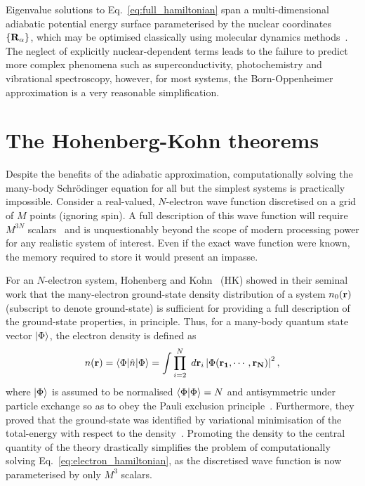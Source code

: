 %
Eigenvalue solutions to Eq.~\eqref{eq:full_hamiltonian} 
span a multi-dimensional adiabatic potential energy surface 
parameterised by the nuclear coordinates $\{{\bf R_\alpha}\}$, 
which may be optimised classically 
using molecular dynamics methods~\cite{PhysRevLett.69.1077,PhysRevLett.55.2471}. 
%
The neglect of explicitly nuclear-dependent terms 
{leads to the failure} to predict more complex phenomena 
such as superconductivity, 
photochemistry and vibrational spectroscopy, 
however, for most systems, 
the Born-Oppenheimer approximation 
is a very reasonable simplification. 



\section{The Hohenberg-Kohn theorems}
\label{sec:hk_theorems}

Despite the benefits of the adiabatic approximation, 
computationally solving the 
many-body Schr\"{o}dinger equation 
for all but the simplest systems is 
practically impossible.
%
Consider a real-valued, $N$-electron wave function 
discretised on a grid of $M$ points 
(ignoring spin).
% 
A full description of this wave function 
will require $M^{3N}$ scalars~\cite{CAPELLE2006} 
and is unquestionably beyond the 
scope of modern processing power 
for any realistic system of interest.
%
Even if the exact wave function were known, 
the memory required to store it would 
present an impasse.


{For an $N$-electron system,
Hohenberg and Kohn~\cite{PhysRev.136.B864} (HK)  
showed in their seminal work 
that the many-electron 
ground-state density distribution 
of a system $n_0({\bf r})$ 
(subscript to denote ground-state)
is sufficient for providing a full description 
of the ground-state properties, 
in principle.}
%
{Thus, for a} many-body quantum state vector $\vert\Phi\rangle$, 
the electron density is defined as 
%
\begin{equation}
n({\bf r})=\langle\Phi\vert\hat n\vert\Phi\rangle=\int\prod_{i=2}^N\ d{{{\bf r}}_i} \left|\Phi({\bf r_1,\cdots,r_N})\right|^2,
\end{equation}
%
where $\vert\Phi\rangle$ is assumed to be 
normalised $\langle\Phi\vert\Phi\rangle=N$ 
and antisymmetric under particle exchange 
so as to obey the Pauli exclusion principle~\cite{PhysRev.58.716}.
%
Furthermore, they proved   
that the ground-state was identified 
by variational minimisation 
of the total-energy with respect to the density~\cite{PhysRev.136.B864}. 
%
Promoting the density to the central quantity 
of the theory drastically simplifies the problem 
of computationally solving Eq.~\eqref{eq:electron_hamiltonian}, 
as the discretised wave function 
is now parameterised by only $M^3$ scalars.
%

